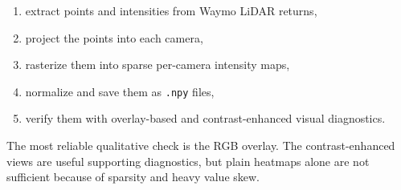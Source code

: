 \documentclass[11pt]{article}
\begin{document}
\begin{enumerate}[leftmargin=1.5em]
    \item extract points and intensities from Waymo LiDAR returns,
    \item project the points into each camera,
    \item rasterize them into sparse per-camera intensity maps,
    \item normalize and save them as \texttt{.npy} files,
    \item verify them with overlay-based and contrast-enhanced visual diagnostics.
\end{enumerate}

The most reliable qualitative check is the RGB overlay. The contrast-enhanced views are useful supporting diagnostics, but plain heatmaps alone are not sufficient because of sparsity and heavy value skew.
\end{document}
